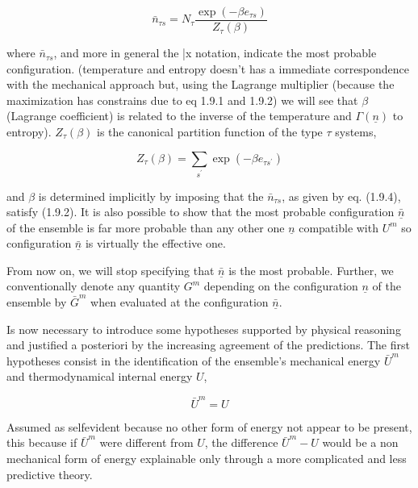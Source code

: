 \documentclass{article}
\begin{document}
\begin{equation}
\bar{n}_{\tau s}=N_{\tau} \frac{\exp \left(-\beta e_{\tau s}\right)}{Z_{\tau}(\beta)} \tag{1.9.4}
\end{equation}

where $\bar{n}_{\tau s}$, and more in general the \bar{x} notation, indicate the most probable configuration. (temperature and entropy doesn't has a immediate correspondence with the mechanical approach but, using the Lagrange multiplier (because the maximization has constrains due to eq 1.9.1 and 1.9.2) we will see that $\beta$ (Lagrange coefficient) is related to the inverse of the temperature and $\Gamma(\underline{n})$ to entropy). $Z_{\tau}(\beta)$ is the canonical partition function of the type $\tau$ systems,

\begin{equation}
Z_{\tau}(\beta)=\sum_{s^{\prime}} \exp \left(-\beta e_{\tau s^{\prime}}\right) \tag{1.9.5}
\end{equation}

and $\beta$ is determined implicitly by imposing that the $\bar{n}_{\tau s}$, as given by eq. (1.9.4), satisfy (1.9.2). It is also possible to show that the most probable configuration $\underline{\bar{n}}$ of the ensemble is far more probable than any other one $\underline{n}$ compatible with $U^{m}$ so configuration $\underline{\bar{n}}$ is virtually the effective one.

From now on, we will stop specifying that $\underline{\bar{n}}$ is the most probable. Further, we conventionally denote any quantity $G^{m}$ depending on the configuration $\underline{n}$ of the ensemble by $\bar{G}^{m}$ when evaluated at the configuration $\underline{\bar{n}}$.

Is now necessary to introduce some hypotheses supported by physical reasoning and justified a posteriori by the increasing agreement of the predictions. The first hypotheses consist in the identification of the ensemble's mechanical energy $\bar{U}^{m}$ and thermodynamical internal energy $U$,

\begin{equation*}
\bar{U}^{m}=U \tag{1.9.25}
\end{equation*}

Assumed as selfevident because no other form of energy not appear to be present, this because if $\bar{U}^{m}$ were different from $U$, the difference $\bar{U}^{m}-U$ would be a non mechanical form of energy explainable only through a more complicated and less predictive theory.
\end{document}

